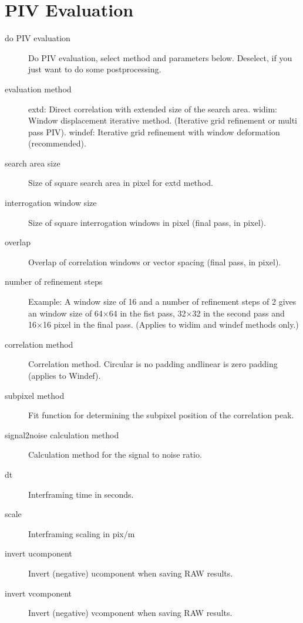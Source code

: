 \documentclass[letterpaper,10pt,english]{sphinxmanual}
\begin{document}
\section{PIV Evaluation}
\label{\detokenize{parameters:piv-evaluation}}\begin{description}
\item[{do PIV evaluation}] \leavevmode
Do PIV evaluation, select method and parameters below. Deselect, if you just want to do some post\sphinxhyphen{}processing.

\item[{evaluation method}] \leavevmode
extd: Direct correlation with extended size of the search area. 
widim: Window displacement iterative method. (Iterative grid refinement or multi pass PIV). 
windef: Iterative grid refinement with window deformation (recommended).

\item[{search area size}] \leavevmode
Size of square search area in pixel for extd method.

\item[{interrogation window size}] \leavevmode
Size of square interrogation windows in pixel (final pass, in pixel).

\item[{overlap}] \leavevmode
Overlap of correlation windows or vector spacing (final pass, in pixel).

\item[{number of refinement steps}] \leavevmode
Example: A window size of 16 and a number of refinement steps of 2 gives an window size of 64×64 in the fist pass, 32×32 in the second pass and 16×16 pixel in the final pass. (Applies to widim and windef methods only.)

\item[{correlation method}] \leavevmode
Correlation method. Circular is no padding andlinear is zero padding (applies to Windef).

\item[{subpixel method}] \leavevmode
Fit function for determining the subpixel position of the correlation peak.

\item[{signal2noise calculation method}] \leavevmode
Calculation method for the signal to noise ratio.

\item[{dt}] \leavevmode
Interframing time in seconds.

\item[{scale}] \leavevmode
Interframing scaling in pix/m

\item[{invert u\sphinxhyphen{}component}] \leavevmode
Invert (negative) u\sphinxhyphen{}component when saving RAW results.

\item[{invert v\sphinxhyphen{}component}] \leavevmode
Invert (negative) v\sphinxhyphen{}component when saving RAW results.

\end{description}
\end{document}
